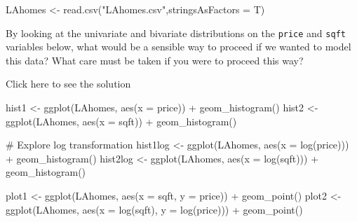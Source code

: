 \documentclass[
  letterpaper,
  DIV=11,
  numbers=noendperiod]{scrartcl}
\newenvironment{Shaded}{\begin{snugshade}}{\end{snugshade}}
\newcommand{\AttributeTok}[1]{\textcolor[rgb]{0.40,0.45,0.13}{#1}}
\newcommand{\CommentTok}[1]{\textcolor[rgb]{0.37,0.37,0.37}{#1}}
\newcommand{\FunctionTok}[1]{\textcolor[rgb]{0.28,0.35,0.67}{#1}}
\newcommand{\NormalTok}[1]{\textcolor[rgb]{0.00,0.23,0.31}{#1}}
\newcommand{\OtherTok}[1]{\textcolor[rgb]{0.00,0.23,0.31}{#1}}
\newcommand{\SpecialCharTok}[1]{\textcolor[rgb]{0.37,0.37,0.37}{#1}}
\newcommand{\StringTok}[1]{\textcolor[rgb]{0.13,0.47,0.30}{#1}}
\begin{document}
\begin{Shaded}
\begin{Highlighting}[]
\NormalTok{LAhomes }\OtherTok{\textless{}{-}} \FunctionTok{read.csv}\NormalTok{(}\StringTok{"LAhomes.csv"}\NormalTok{,}\AttributeTok{stringsAsFactors =}\NormalTok{ T)}
\end{Highlighting}
\end{Shaded}

\begin{tcolorbox}[enhanced jigsaw, toprule=.15mm, breakable, bottomtitle=1mm, coltitle=black, colback=white, arc=.35mm, left=2mm, leftrule=.75mm, opacitybacktitle=0.6, colframe=quarto-callout-warning-color-frame, colbacktitle=quarto-callout-warning-color!10!white, toptitle=1mm, titlerule=0mm, opacityback=0, title={Task 1}, rightrule=.15mm, bottomrule=.15mm]

By looking at the univariate and bivariate distributions on the
\texttt{price} and \texttt{sqft} variables below, what would be a
sensible way to proceed if we wanted to model this data? What care must
be taken if you were to proceed this way?

Click here to see the solution

\begin{Shaded}
\begin{Highlighting}[]
\NormalTok{hist1 }\OtherTok{\textless{}{-}} \FunctionTok{ggplot}\NormalTok{(LAhomes, }\FunctionTok{aes}\NormalTok{(}\AttributeTok{x =}\NormalTok{ price)) }\SpecialCharTok{+}
          \FunctionTok{geom\_histogram}\NormalTok{()}
\NormalTok{hist2 }\OtherTok{\textless{}{-}} \FunctionTok{ggplot}\NormalTok{(LAhomes, }\FunctionTok{aes}\NormalTok{(}\AttributeTok{x =}\NormalTok{ sqft)) }\SpecialCharTok{+}
          \FunctionTok{geom\_histogram}\NormalTok{()}

\CommentTok{\# Explore log transformation}
\NormalTok{hist1log }\OtherTok{\textless{}{-}} \FunctionTok{ggplot}\NormalTok{(LAhomes, }\FunctionTok{aes}\NormalTok{(}\AttributeTok{x =} \FunctionTok{log}\NormalTok{(price))) }\SpecialCharTok{+}
             \FunctionTok{geom\_histogram}\NormalTok{()}
\NormalTok{hist2log }\OtherTok{\textless{}{-}} \FunctionTok{ggplot}\NormalTok{(LAhomes, }\FunctionTok{aes}\NormalTok{(}\AttributeTok{x =} \FunctionTok{log}\NormalTok{(sqft))) }\SpecialCharTok{+}
             \FunctionTok{geom\_histogram}\NormalTok{()}

\NormalTok{plot1 }\OtherTok{\textless{}{-}} \FunctionTok{ggplot}\NormalTok{(LAhomes, }\FunctionTok{aes}\NormalTok{(}\AttributeTok{x =}\NormalTok{ sqft, }\AttributeTok{y =}\NormalTok{ price)) }\SpecialCharTok{+}
          \FunctionTok{geom\_point}\NormalTok{()}
\NormalTok{plot2 }\OtherTok{\textless{}{-}} \FunctionTok{ggplot}\NormalTok{(LAhomes, }\FunctionTok{aes}\NormalTok{(}\AttributeTok{x =} \FunctionTok{log}\NormalTok{(sqft), }\AttributeTok{y =} \FunctionTok{log}\NormalTok{(price))) }\SpecialCharTok{+}
          \FunctionTok{geom\_point}\NormalTok{()}


\end{Highlighting}
\end{Shaded}
\end{tcolorbox}
\end{document}
